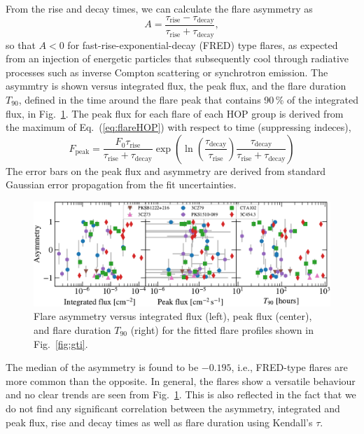 \documentclass[twocolumn]{aastex62}
\begin{document}
From the rise and decay times, we can calculate the flare asymmetry as
\begin{equation}
    A = \frac{\tau_\mathrm{rise}-\tau_\mathrm{decay}}
    {\tau_\mathrm{rise}+\tau_\mathrm{decay}},
\end{equation}
so that $A < 0$ for fast-rise-exponential-decay (FRED) type flares, as expected from an injection of energetic particles that subsequently cool through radiative processes such as inverse Compton scattering or synchrotron emission.
The asymmtry is shown versus integrated flux, the peak flux, and the flare duration $T_{90}$, defined in the time around the flare peak that contains 90\,\% of the integrated flux, in Fig.~\ref{fig:asym}.
The peak flux for each flare of each HOP group is derived from the maximum of  Eq.~(\ref{eq:flareHOP}) with respect to time (suppressing indeces),
\begin{equation}
    F_{\mathrm{peak}} = \frac{F_{0} \tau_\mathrm{rise}}{\tau_\mathrm{rise} + \tau_\mathrm{decay}}\exp\left(\ln\left(\frac{\tau_\mathrm{decay}}{\tau_\mathrm{rise}}\right)\frac{\tau_\mathrm{decay}}{\tau_\mathrm{rise} + \tau_\mathrm{decay}}\right)
\end{equation}
The error bars on the peak flux and asymmetry are derived from standard Gaussian error propagation from the fit uncertainties.
\begin{figure}
    \centering
    \includegraphics[width = .8\linewidth]{figures/lcfithop_results_asym_vs_all_orbit_maxiter2_fsys0p00_addcomp0.pdf}
    \caption{Flare asymmetry versus integrated flux (left), peak flux (center), and flare duration $T_{90}$ (right) for the fitted flare profiles shown in Fig.~\ref{fig:gti}.}
    \label{fig:asym}
\end{figure}

The median of the asymmetry is found to be $-0.195$, i.e., FRED-type flares are more common than the opposite. In general, the flares show a versatile behaviour and no clear trends are seen from Fig.~\ref{fig:asym}. This is also reflected in the fact that we do not find any significant correlation between the asymmetry, integrated and peak flux, rise and decay times as well as flare duration using Kendall's $\tau$.
\end{document}
